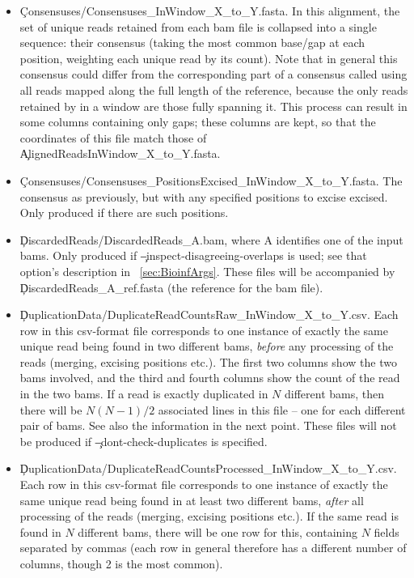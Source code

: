 \begin{itemize}
\item \c{Consensuses/Consensuses\_InWindow\_X\_to\_Y.fasta}.
In this alignment, the set of unique reads retained from each bam file is collapsed into a single sequence: their consensus (taking the most common base/gap at each position, weighting each unique read by its count).
Note that in general this consensus could differ from the corresponding part of a consensus called using all reads mapped along the full length of the reference, because the only reads retained by \pmt in a window are those fully spanning it.
This process can result in some columns containing only gaps; these columns are kept, so that the coordinates of this file match those of \\\c{AlignedReadsInWindow\_X\_to\_Y.fasta}.
\item \c{Consensuses/Consensuses\_PositionsExcised\_InWindow\_X\_to\_Y.fasta}.
The consensus as previously, but with any specified positions to excise excised.
Only produced if there are such positions.
\item \c{DiscardedReads/DiscardedReads\_A.bam}, where A identifies one of the input bams.
Only produced if \c{--inspect-disagreeing-overlaps} is used; see that option's description in ~\ref{sec:BioinfArgs}.
These files will be accompanied by \c{DiscardedReads\_A\_ref.fasta} (the reference for the bam file).
\item \c{DuplicationData/DuplicateReadCountsRaw\_InWindow\_X\_to\_Y.csv}.
Each row in this csv-format file corresponds to one instance of exactly the same unique read being found in two different bams, {\it before} any processing of the reads (merging, excising positions etc.).
The first two columns show the two bams involved, and the third and fourth columns show the count of the read in the two bams.
If a read is exactly duplicated in $N$ different bams, then there will be $N(N-1)/2$ associated lines in this file -- one for each different pair of bams.
See also the information in the next point.
These files will not be produced if \c{--dont-check-duplicates} is specified.
\item \c{DuplicationData/DuplicateReadCountsProcessed\_InWindow\_X\_to\_Y.csv}.
Each row in this csv-format file corresponds to one instance of exactly the same unique read being found in at least two different bams, {\it after} all processing of the reads (merging, excising positions etc.).
If the same read is found in $N$ different bams, there will be one row for this, containing $N$ fields separated by commas (each row in general therefore has a different number of columns, though 2 is the most common).

\end{itemize}

